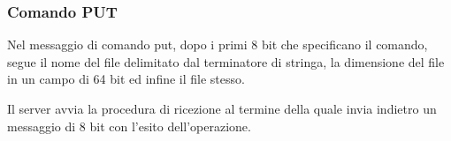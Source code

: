 \subsubsection{Comando PUT}
Nel messaggio di comando put, dopo i primi 8 bit che specificano il comando, segue il nome del file delimitato dal terminatore di stringa, la dimensione del file in un campo di 64 bit ed infine il file stesso.


Il server avvia la procedura di ricezione al termine della quale invia indietro un messaggio di 8 bit con l'esito dell'operazione.

